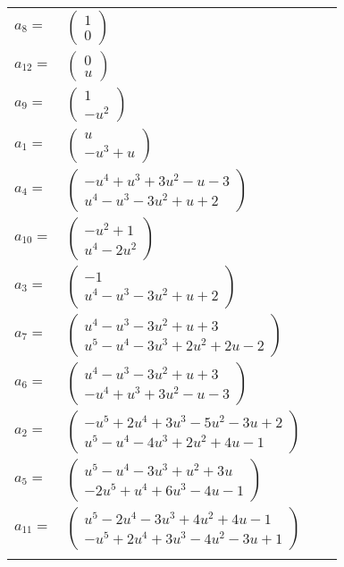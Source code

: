 \documentclass[1p]{elsarticle_modified}
\theoremstyle{definition}
\begin{document}
\begin{tabular}{m{7pt} m{180pt} m{7pt} m{180pt} }
\flushright $a_{8}=$&$\begin{pmatrix}1\\0\end{pmatrix}$ \\
\flushright $a_{12}=$&$\begin{pmatrix}0\\u\end{pmatrix}$ \\
\flushright $a_{9}=$&$\begin{pmatrix}1\\- u^2\end{pmatrix}$ \\
\flushright $a_{1}=$&$\begin{pmatrix}u\\- u^3+u\end{pmatrix}$ \\
\flushright $a_{4}=$&$\begin{pmatrix}- u^4+u^3+3 u^2- u-3\\u^4- u^3-3 u^2+u+2\end{pmatrix}$ \\
\flushright $a_{10}=$&$\begin{pmatrix}- u^2+1\\u^4-2 u^2\end{pmatrix}$ \\
\flushright $a_{3}=$&$\begin{pmatrix}-1\\u^4- u^3-3 u^2+u+2\end{pmatrix}$ \\
\flushright $a_{7}=$&$\begin{pmatrix}u^4- u^3-3 u^2+u+3\\u^5- u^4-3 u^3+2 u^2+2 u-2\end{pmatrix}$ \\
\flushright $a_{6}=$&$\begin{pmatrix}u^4- u^3-3 u^2+u+3\\- u^4+u^3+3 u^2- u-3\end{pmatrix}$ \\
\flushright $a_{2}=$&$\begin{pmatrix}- u^5+2 u^4+3 u^3-5 u^2-3 u+2\\u^5- u^4-4 u^3+2 u^2+4 u-1\end{pmatrix}$ \\
\flushright $a_{5}=$&$\begin{pmatrix}u^5- u^4-3 u^3+u^2+3 u\\-2 u^5+u^4+6 u^3-4 u-1\end{pmatrix}$ \\
\flushright $a_{11}=$&$\begin{pmatrix}u^5-2 u^4-3 u^3+4 u^2+4 u-1\\- u^5+2 u^4+3 u^3-4 u^2-3 u+1\end{pmatrix}$\\&\end{tabular}
\end{document}
